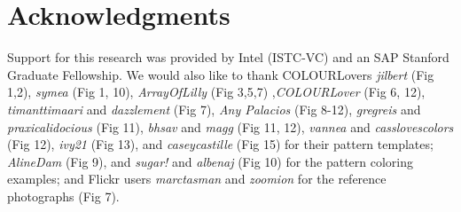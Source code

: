 \section*{Acknowledgments}

Support for this research was provided by Intel (ISTC-VC) and an SAP Stanford Graduate Fellowship.
We would also like to thank COLOURLovers \textit{jilbert} (Fig 1,2), \textit{symea} (Fig 1, 10), \textit{ArrayOfLilly} (Fig 3,5,7) ,\textit{COLOURLover} (Fig 6, 12), \textit{timanttimaari} and \textit{dazzlement} (Fig 7), \textit{Any Palacios} (Fig 8-12), \textit{gregreis} and \textit{praxicalidocious} (Fig 11), \textit{bhsav} and \textit{magg} (Fig 11, 12), \textit{vannea} and \textit{casslovescolors} (Fig 12), \textit{ivy21} (Fig 13), and \textit{caseycastille} (Fig 15) for their pattern templates; \textit{AlineDam} (Fig 9), and \textit{sugar!} and \textit{albenaj} (Fig 10) for the pattern coloring examples; and Flickr users \textit{marctasman} and \textit{zoomion} for the reference photographs (Fig 7).   
